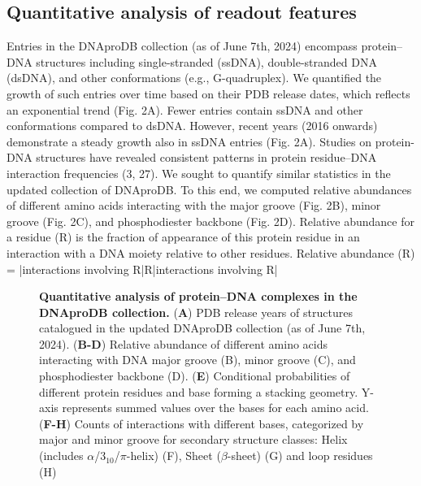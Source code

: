 \subsection{Quantitative analysis of readout features}
Entries in the DNAproDB collection (as of June 7th, 2024) encompass protein–DNA structures including single-stranded (ssDNA), double-stranded DNA (dsDNA), and other conformations (e.g., G-quadruplex). We quantified the growth of such entries over time based on their PDB release dates, which reflects an exponential trend (Fig. 2A). Fewer entries contain ssDNA and other conformations compared to dsDNA. However, recent years (2016 onwards) demonstrate a steady growth also in ssDNA entries (Fig. 2A). 
Studies on protein-DNA structures have revealed consistent patterns in protein residue–DNA interaction frequencies (3, 27). We sought to quantify similar statistics in the updated collection of DNAproDB. To this end, we computed relative abundances of different amino acids interacting with the major groove (Fig. 2B), minor groove (Fig. 2C), and phosphodiester backbone (Fig. 2D). Relative abundance for a residue (R) is the fraction of appearance of this protein residue in an interaction with a DNA moiety relative to other residues. 
Relative abundance (R) = |interactions involving R|R|interactions involving R|

\begin{center}
    \begin{figure}
        \caption[Quantitative analysis of protein–DNA complexes in the DNAproDB collection. ]{\textbf{Quantitative analysis of protein–DNA complexes in the DNAproDB collection. } ({\bf A}) PDB release years of structures catalogued in the updated DNAproDB collection (as of June 7th, 2024). ({\bf B-D})   Relative abundance of different amino acids interacting with DNA major groove (B), minor groove (C), and phosphodiester backbone (D). ({\bf E}) Conditional probabilities of different protein residues and base forming a stacking geometry. Y-axis represents summed values over the bases for each amino acid.({\bf F-H}) Counts of interactions with different bases, categorized by major and minor groove for secondary structure classes: Helix (includes $\alpha$/$3_{10}$/$\pi$-helix) (F), Sheet ($\beta$-sheet) (G) and loop residues (H) }
  \label{fig:dnaprodb2}
\end{figure}
\end{center}

